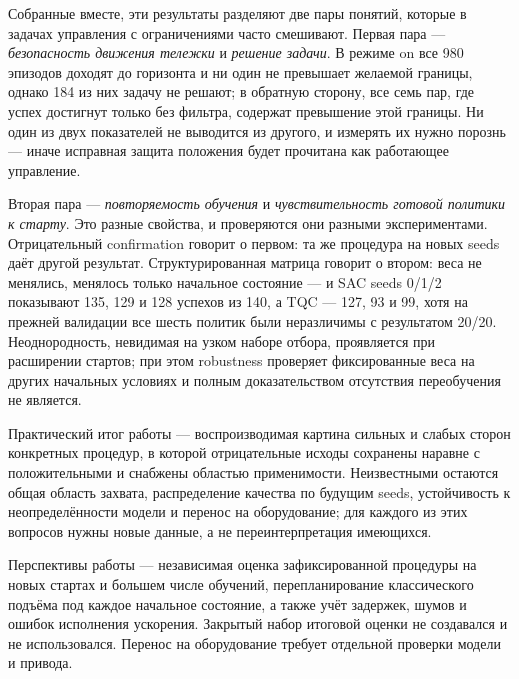Собранные вместе, эти результаты разделяют две пары понятий, которые в задачах управления с ограничениями часто смешивают. Первая пара — \emph{безопасность движения тележки} и \emph{решение задачи}. В режиме on все 980 эпизодов доходят до горизонта и ни один не превышает желаемой границы, однако 184 из них задачу не решают; в обратную сторону, все семь пар, где успех достигнут только без фильтра, содержат превышение этой границы. Ни один из двух показателей не выводится из другого, и измерять их нужно порознь — иначе исправная защита положения будет прочитана как работающее управление.

Вторая пара — \emph{повторяемость обучения} и \emph{чувствительность готовой политики к старту}. Это разные свойства, и проверяются они разными экспериментами. Отрицательный confirmation говорит о первом: та же процедура на новых seeds даёт другой результат. Структурированная матрица говорит о втором: веса не менялись, менялось только начальное состояние — и SAC seeds 0/1/2 показывают 135, 129 и 128 успехов из 140, а TQC — 127, 93 и 99, хотя на прежней валидации все шесть политик были неразличимы с результатом 20/20. Неоднородность, невидимая на узком наборе отбора, проявляется при расширении стартов; при этом robustness проверяет фиксированные веса на других начальных условиях и полным доказательством отсутствия переобучения не является.

Практический итог работы — воспроизводимая картина сильных и слабых сторон конкретных процедур, в которой отрицательные исходы сохранены наравне с положительными и снабжены областью применимости. Неизвестными остаются общая область захвата, распределение качества по будущим seeds, устойчивость к неопределённости модели и перенос на оборудование; для каждого из этих вопросов нужны новые данные, а не переинтерпретация имеющихся.

Перспективы работы — независимая оценка зафиксированной процедуры на новых стартах и большем числе обучений, перепланирование классического подъёма под каждое начальное состояние, а также учёт задержек, шумов и ошибок исполнения ускорения. Закрытый набор итоговой оценки не создавался и не использовался. Перенос на оборудование требует отдельной проверки модели и привода.
